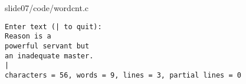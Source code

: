 \begin{frame}\ft{\secname}
  
  {slide07/code/wordcnt.c}
\end{frame}


\begin{frame}[fragile]\ft{\secname}
\begin{lstlisting}[backgroundcolor=\color{blue!20}]
Enter text (| to quit):
Reason is a 
powerful servant but
an inadequate master.
|
characters = 56, words = 9, lines = 3, partial lines = 0
\end{lstlisting}
\end{frame}

